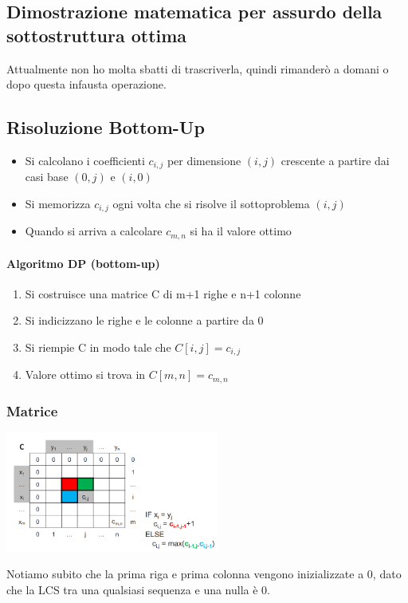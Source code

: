 \subsection{Dimostrazione matematica per assurdo della sottostruttura ottima}
Attualmente non ho molta sbatti di trascriverla, quindi rimanderò a domani o dopo questa
infausta operazione.
\subsection{Risoluzione Bottom-Up}
\begin{itemize}
    \item Si calcolano i coefficienti $c_{i,j}$ per dimensione $(i,j)$ crescente
    a partire dai casi base $(0,j)$ e $(i,0)$
    \item Si memorizza $c_{i,j}$ ogni volta che si risolve il sottoproblema $(i,j)$
    \item Quando si arriva a calcolare $c_{m,n}$ si ha il valore ottimo
\end{itemize}
\paragraph*{Algoritmo DP (bottom-up)}
\begin{enumerate}
    \item Si costruisce una matrice C di m+1 righe e n+1 colonne
    \item Si indicizzano le righe e le colonne a partire da 0
    \item Si riempie C in modo tale che $C[i,j] = c_{i,j}$
    \item Valore ottimo si trova in $C[m,n] = c_{m,n}$
\end{enumerate}
\subsubsection*{Matrice}
\begin{center}
    \includegraphics[width=70mm,scale=0.5]{chapters_ulerich/img/LCS_matrix.png}
\end{center}
Notiamo subito che la prima riga e prima colonna vengono inizializzate a 0, dato che
la LCS tra una qualsiasi sequenza e una nulla è 0.

